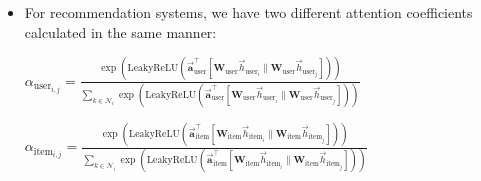 \documentclass{beamer}
\begin{document}

\begin{frame}[fragile]
\begin{itemize}
\frametitle{(2) Case Study: Self-Attention}
[ball]

\item For recommendation systems, we have two different attention coefficients calculated in the same manner:

\vspace{0.3cm}

\begin{center}
    $\alpha_{\text{user}_{i,j}} = \frac{\exp\left(\mathrm{LeakyReLU}\left( \overrightarrow{\mathbf{a}}_{\text{user}}^{\top}[\mathbf{W}_{\text{user}}\overrightarrow{h}_{\text{user}_{i}}\|\mathbf{W}_{\text{user}}\overrightarrow{h}_{\text{user}_{j}}]\right)\right)}{\sum_{k \in \mathcal{N}_{i}}\exp\left(\mathrm{LeakyReLU}\left( \overrightarrow{\mathbf{a}}_{\text{user}}^{\top}[\mathbf{W}_{\text{user}}\overrightarrow{h}_{\text{user}_{i}}\|\mathbf{W}_{\text{user}}\overrightarrow{h}_{\text{user}_{j}}]\right)\right)}$
\end{center}

\vspace{0.3cm}

\begin{center}
    $\alpha_{\text{item}_{i,j}} = \frac{\exp\left(\mathrm{LeakyReLU}\left( \overrightarrow{\mathbf{a}}_{\text{item}}^{\top}[\mathbf{W}_{\text{item}}\overrightarrow{h}_{\text{item}_{i}}\|\mathbf{W}_{\text{item}}\overrightarrow{h}_{\text{item}_{j}}]\right)\right)}{\sum_{k \in \mathcal{N}_{i}}\exp\left(\mathrm{LeakyReLU}\left( \overrightarrow{\mathbf{a}}_{\text{item}}^{\top}[\mathbf{W}_{\text{item}}\overrightarrow{h}_{\text{item}_{i}}\|\mathbf{W}_{\text{item}}\overrightarrow{h}_{\text{item}_{j}}]\right)\right)}$
\end{center}

\end{itemize}
\end{frame}

\end{document}
